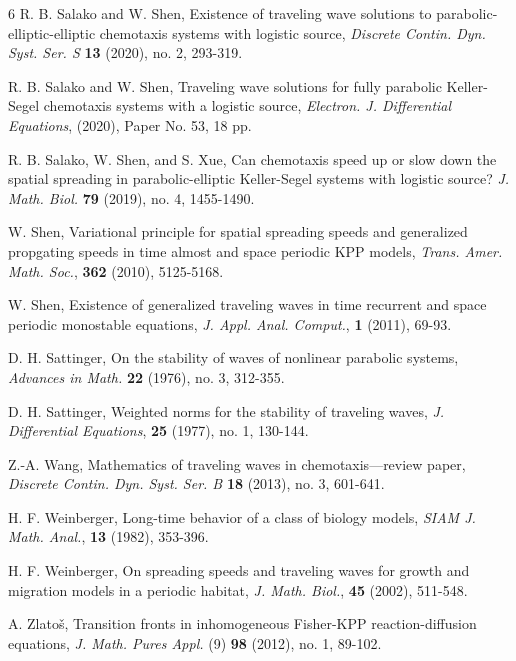 \documentclass[11pt]{article} %
\theoremstyle{remark}
\theoremstyle{remark}
\numberwithin{equation}{section}
\numberwithin{figure}{section}
\numberwithin{table}{section}
\begin{document}
\begin{thebibliography}{6}
  R. B. Salako and W. Shen,
Existence of traveling wave solutions to parabolic-elliptic-elliptic chemotaxis systems with logistic source, {\it Discrete Contin. Dyn. Syst. Ser. S} {\bf 13} (2020), no. 2, 293-319.

 R. B. Salako and W. Shen, 
Traveling wave solutions for fully parabolic Keller-Segel chemotaxis systems with a logistic source,
{\it 
Electron. J. Differential Equations},   (2020), Paper No. 53, 18 pp.

  R. B. 
Salako, W. Shen, and S.  Xue, 
Can chemotaxis speed up or slow down the spatial spreading in parabolic-elliptic Keller-Segel systems with logistic source? {\it 
J. Math. Biol. } {\bf 79}  (2019), no. 4, 1455-1490.



   W. Shen, Variational principle for spatial spreading
speeds and generalized propgating speeds  in time almost and space periodic KPP models, {\it Trans. Amer. Math.
Soc.}, {\bf 362} (2010),  5125-5168.

 W. Shen, Existence of generalized traveling waves in time recurrent and space periodic monostable equations,
{\it  J. Appl. Anal. Comput.}, {\bf  1} (2011),  69-93.

 D. H. 
Sattinger, 
On the stability of waves of nonlinear parabolic systems,
{\it Advances in Math.} {\bf  22} (1976), no. 3, 312-355.

 D. H.
Sattinger, 
Weighted norms for the stability of traveling waves,
{\it 
J. Differential Equations}, {\bf  25}  (1977), no. 1, 130-144.
  

     Z.-A. Wang,  Mathematics of traveling waves in chemotaxis—review paper,
{\it  Discrete Contin. Dyn. Syst. Ser. B} {\bf 18} (2013), no. 3, 601-641.


 H. F.  Weinberger, Long-time behavior of a class of
biology models, {\it SIAM J. Math. Anal.}, {\bf 13} (1982),  353-396.

H. F.  Weinberger, On spreading speeds and traveling
waves for growth and migration models in a periodic habitat, {\it J. Math. Biol.}, {\bf 45} (2002),  511-548.



 A. Zlato\v s,  Transition fronts in inhomogeneous Fisher-KPP reaction-diffusion equations,
 {\it J. Math. Pures Appl.} (9) {\bf 98} (2012), no. 1, 89-102.


\end{thebibliography}
\end{document}
